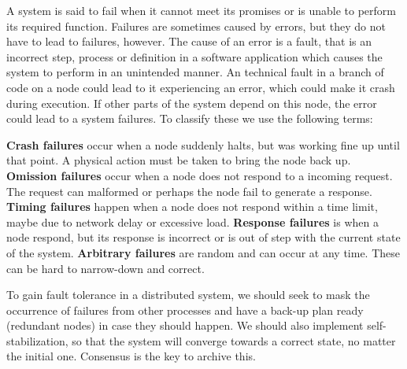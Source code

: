 \noindent A system is said to fail when it cannot meet its promises or is unable to perform its required function. Failures are sometimes caused by errors, but they do not have to lead to failures, however. The cause of an error is a fault, that is an incorrect step, process or definition in a software application which causes the system to perform in an unintended manner. An technical fault in a branch of code on a node could lead to it experiencing an error, which could make it crash during execution. If other parts of the system depend on this node, the error could lead to a system failures. To classify these we use the following terms:

\noindent \textbf{Crash failures} occur when a node suddenly halts, but was working fine up until that point. A physical action must be taken to bring the node back up. \textbf{Omission failures} occur when a node does not respond to a incoming request. The request can malformed or perhaps the node fail to generate a response. \textbf{Timing failures} happen when a node does not respond within a time limit, maybe due to network delay or excessive load. \textbf{Response failures} is when a node respond, but its response is incorrect or is out of step with the current state of the system. \textbf{Arbitrary failures} are random and can occur at any time. These can be hard to narrow-down and correct.

\noindent To gain fault tolerance in a distributed system, we should seek to mask the occurrence of failures from other processes and have a back-up plan ready (redundant nodes) in case they should happen. We should also implement self-stabilization, so that the system will converge towards a correct state, no matter the initial one. Consensus is the key to archive this.